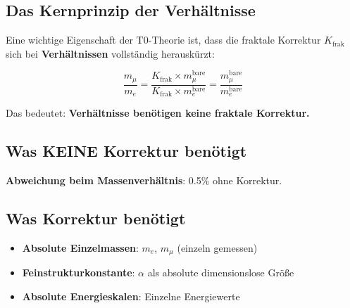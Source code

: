 	\subsection{Das Kernprinzip der Verhältnisse}
	
	\begin{tcolorbox}[colback=blue!10!white,colframe=blue!75!black,title=Fraktale Korrekturen kürzen sich in Verhältnissen]
		Eine wichtige Eigenschaft der T0-Theorie ist, dass die fraktale Korrektur $K_{\text{frak}}$ sich bei \textbf{Verhältnissen} vollständig herauskürzt:
		
		\begin{equation}
			\frac{m_\mu}{m_e} = \frac{K_{\text{frak}} \times m_\mu^{\text{bare}}}{K_{\text{frak}} \times m_e^{\text{bare}}} = \frac{m_\mu^{\text{bare}}}{m_e^{\text{bare}}}
		\end{equation}
		
		Das bedeutet: \textbf{Verhältnisse benötigen keine fraktale Korrektur.}
	\end{tcolorbox}
	
	\subsection{Was KEINE Korrektur benötigt}
	
	\begin{table}[h]
		\centering
		\caption{Größ{}en die KEINE fraktale Korrektur benötigen}
	\end{table}
	
	\textbf{Abweichung beim Massenverhältnis}: 0.5\% ohne Korrektur.
	
	\subsection{Was Korrektur benötigt}
	
	\begin{itemize}
		\item \textbf{Absolute Einzelmassen}: $m_e$, $m_\mu$ (einzeln gemessen)
		\item \textbf{Feinstrukturkonstante}: $\alpha$ als absolute dimensionslose Größ{}e
		\item \textbf{Absolute Energieskalen}: Einzelne Energiewerte
	\end{itemize}
	
